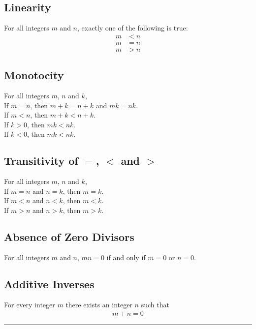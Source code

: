 \documentclass[../notes.tex]{subfiles}
\begin{document}
			\subsection{Linearity}
				For all integers $m$ and $n$, exactly one of the following is true:
				\begin{align*}
					m &< n\\
					m &= n\\
					m &> n
				\end{align*}
			\subsection{Monotocity}
				For all integers $m$, $n$ and $k$,\\
				\-\hspace{2em}If $m = n$, then $m + k = n + k$ and $mk = nk$.\\
				\-\hspace{2em}If $m < n$, then $m + k < n + k$.\\
				\-\hspace{4em}If $k > 0$, then $mk < nk$.\\
				\-\hspace{4em}If $k < 0$, then $mk < nk$.
			\subsection{Transitivity of \texorpdfstring{$=$}{=}, \texorpdfstring{$<$}{<} and \texorpdfstring{$>$}{>}}
				For all integers $m$, $n$ and $k$,\\
				\-\hspace{2em}If $m = n$ and $n = k$, then $m = k$.\\
				\-\hspace{2em}If $m < n$ and $n < k$, then $m < k$.\\
				\-\hspace{2em}If $m > n$ and $n > k$, then $m > k$.
			\subsection{Absence of Zero Divisors}
				For all integers $m$ and $n$,
				\-\hspace{2em}$mn = 0$ if and only if $m = 0$ or $n = 0$.
			\subsection{Additive Inverses}
				For every integer $m$ there exists an integer $n$ such that
				\begin{align*}
					m + n = 0
				\end{align*}
		\noindent\rule{\textwidth}{0.4pt}
\end{document}

